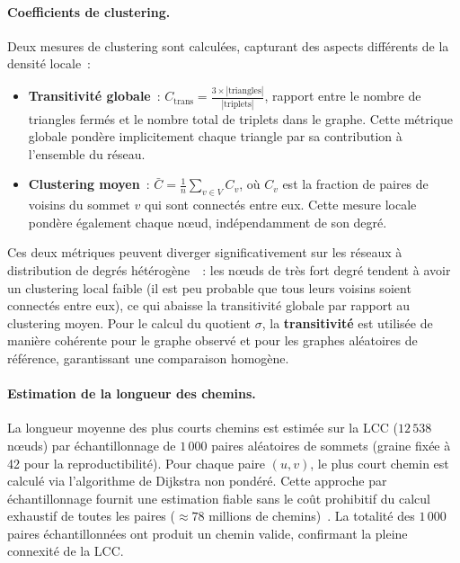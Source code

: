 \paragraph{Coefficients de clustering.}
Deux mesures de clustering sont calcul\'ees, capturant des aspects diff\'erents de la densit\'e locale~:
\begin{itemize}
  \item \textbf{Transitivit\'e globale}~: $C_{\text{trans}} = \frac{3 \times |\text{triangles}|}{|\text{triplets}|}$, rapport entre le nombre de triangles ferm\'es et le nombre total de triplets dans le graphe. Cette m\'etrique globale pond\`ere implicitement chaque triangle par sa contribution \`a l'ensemble du r\'eseau.
  \item \textbf{Clustering moyen}~: $\bar{C} = \frac{1}{n} \sum_{v \in V} C_v$, o\`u $C_v$ est la fraction de paires de voisins du sommet $v$ qui sont connect\'es entre eux. Cette mesure locale pond\`ere \'egalement chaque n\oe{}ud, ind\'ependamment de son degr\'e.
\end{itemize}
Ces deux m\'etriques peuvent diverger significativement sur les r\'eseaux \`a distribution de degr\'es h\'et\'erog\`ene~\cite{newman2018networks}~: les n\oe{}uds de tr\`es fort degr\'e tendent \`a avoir un clustering local faible (il est peu probable que tous leurs voisins soient connect\'es entre eux), ce qui abaisse la transitivit\'e globale par rapport au clustering moyen. Pour le calcul du quotient $\sigma$, la \textbf{transitivit\'e} est utilis\'ee de mani\`ere coh\'erente pour le graphe observ\'e et pour les graphes al\'eatoires de r\'ef\'erence, garantissant une comparaison homog\`ene.

\paragraph{Estimation de la longueur des chemins.}
La longueur moyenne des plus courts chemins est estim\'ee sur la LCC ($12\,538$ n\oe{}uds) par \'echantillonnage de $1\,000$ paires al\'eatoires de sommets (graine fix\'ee \`a 42 pour la reproductibilit\'e). Pour chaque paire $(u, v)$, le plus court chemin est calcul\'e via l'algorithme de Dijkstra non pond\'er\'e. Cette approche par \'echantillonnage fournit une estimation fiable sans le co\^ut prohibitif du calcul exhaustif de toutes les paires ($\approx 78$ millions de chemins)~\cite{newman2018networks}. La totalit\'e des $1\,000$ paires \'echantillonn\'ees ont produit un chemin valide, confirmant la pleine connexit\'e de la LCC.

